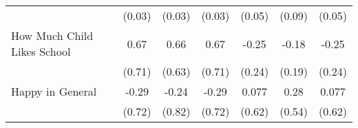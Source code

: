 {\begin{tabular}{l*{6}{c}}
            &      (0.03)         &      (0.03)         &      (0.03)         &      (0.05)         &      (0.09)         &      (0.05)         \\
\addlinespace
How Much Child Likes School&        0.67         &        0.66         &        0.67         &       -0.25         &       -0.18         &       -0.25         \\
            &      (0.71)         &      (0.63)         &      (0.71)         &      (0.24)         &      (0.19)         &      (0.24)         \\
\addlinespace
Happy in General&       -0.29         &       -0.24         &       -0.29         &       0.077         &        0.28         &       0.077         \\
            &      (0.72)         &      (0.82)         &      (0.72)         &      (0.62)         &      (0.54)         &      (0.62)         \\
\bottomrule
\end{tabular}
}
